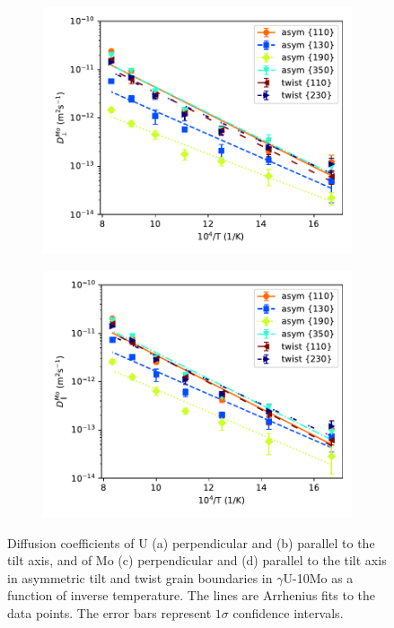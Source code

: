 \documentclass{elsarticle}
\begin{document}
\begin{figure}[!ht]
\begin{subfigure}{0.49\textwidth}
	\centering
	\caption{}
	\includegraphics[width=\textwidth]{asym_twist_Mo_Dx.pdf}
\end{subfigure}
\begin{subfigure}{0.49\textwidth}
	\centering
	\caption{}
	\includegraphics[width=\textwidth]{asym_twist_Mo_Dz.pdf}
\end{subfigure}
\caption{Diffusion coefficients of U (a) perpendicular and (b) parallel to the tilt axis, and of Mo (c) perpendicular and (d) parallel to the tilt axis in asymmetric tilt and twist grain boundaries in $\gamma$U-10Mo as a function of inverse temperature. The lines are Arrhenius fits to the data points. The error bars represent $1\sigma$ confidence intervals.}
\label{fig:asym}
\end{figure}
\end{document}
